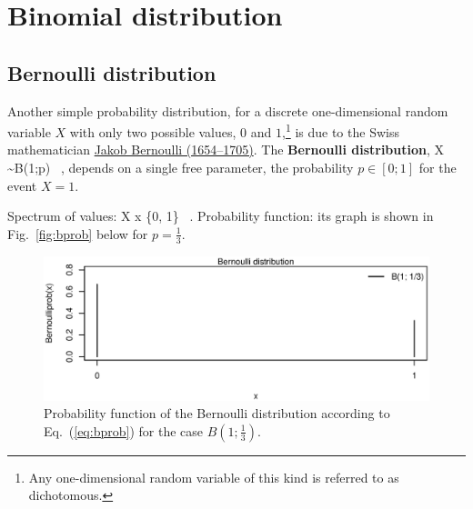 \section[Binomial distribution]{Binomial distribution}
\subsection[Bernoulli distribution]{Bernoulli distribution}
Another simple probability distribution, for a discrete 
one-dimensional random variable $X$ with only two possible values, 
$0$ and $1$,\footnote{Any one-dimensional random variable of this 
kind is referred to as dichotomous.} is due to the Swiss 
mathematician 
\href{http://www-history.mcs.st-and.ac.uk/Biographies/Bernoulli_Jacob.html}{Jakob Bernoulli (1654--1705)}. The \textbf{Bernoulli 
distribution},
%
\be
X \sim B(1;p) \ ,
\ee
%
depends on a single free parameter, the probability $p \in [0;1]$
for the event $X=1$.

\medskip
\noindent
Spectrum of values:
%
\be
X \mapsto x \in \left\{0, 1\right\} \ .
\ee
%
Probability function:
%
\be
{}
\ee
%
its graph is shown in Fig.~\ref{fig:bprob} below for 
$\displaystyle p=\frac{1}{3}$.
%
\begin{figure}[!htb]
\begin{center}
\includegraphics[scale=0.8]{bprob.eps}
\end{center}
\caption{Probability function of the Bernoulli distribution 
according to Eq.~(\ref{eq:bprob}) for the case $\displaystyle 
B\left(1;\frac{1}{3}\right)$.}
\end{figure}
%

